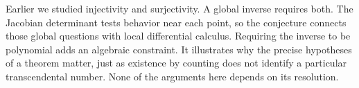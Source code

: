  Earlier we studied injectivity
and surjectivity. A global inverse requires both. The Jacobian determinant
tests behavior near each point, so the conjecture connects those global
questions with local differential calculus. Requiring the inverse to be
polynomial adds an algebraic constraint. It illustrates why the precise
hypotheses of a theorem matter, just as existence by counting does not
identify a particular transcendental number. None of the arguments here
depends on its resolution.
